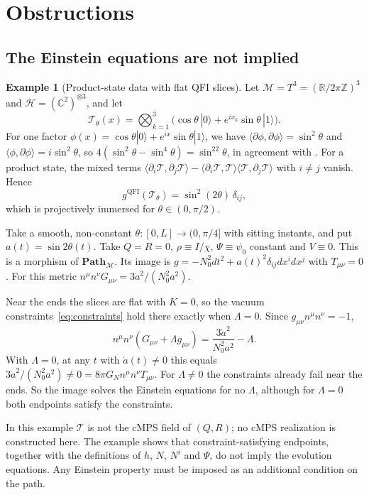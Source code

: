 \documentclass[11pt,a4paper,reqno]{amsart}
\theoremstyle{definition}
\newtheorem{example}[theorem]{Example}
\numberwithin{equation}{section}
\newcommand{\R}{\mathbb{R}}
\newcommand{\C}{\mathbb{C}}
\newcommand{\QFI}{\mathrm{QFI}}
\newcommand{\Path}{\mathbf{Path}_{\mathcal{M}}}
\begin{document}
\section{Obstructions}
\label{sec:obstructions}

\subsection{The Einstein equations are not implied}

\begin{example}[Product-state data with flat QFI slices]\label{ex:frw}
Let $\mathcal{M}=T^3=(\R/2\pi\mathbb{Z})^3$ and $\mathcal{H}=(\C^2)^{\otimes3}$, and let
\[
\mathcal{T}_\theta(x)=\bigotimes_{k=1}^3\big(\cos\theta\,|0\rangle+e^{ix_k}\sin\theta\,|1\rangle\big).
\]
For one factor $\phi(x)=\cos\theta|0\rangle+e^{ix}\sin\theta|1\rangle$, we have $\langle\partial\phi,\partial\phi\rangle=\sin^2\theta$ and $\langle\phi,\partial\phi\rangle=i\sin^2\theta$, so $4(\sin^2\theta-\sin^4\theta)=\sin^22\theta$, in agreement with \cite[Eq.~(29)]{liu2020qfi}. For a product state, the mixed terms $\langle\partial_i\mathcal{T},\partial_j\mathcal{T}\rangle-\langle\partial_i\mathcal{T},\mathcal{T}\rangle\langle\mathcal{T},\partial_j\mathcal{T}\rangle$ with $i\neq j$ vanish. Hence
\[
g^{\QFI}(\mathcal{T}_\theta)=\sin^2(2\theta)\,\delta_{ij},
\]
which is projectively immersed for $\theta\in(0,\pi/2)$.

Take a smooth, non-constant $\theta:[0,L]\to(0,\pi/4]$ with sitting instants, and put $a(t)=\sin2\theta(t)$. Take $Q=R=0$, $\rho\equiv I/\chi$, $\Psi\equiv\psi_0$ constant and $V\equiv0$. This is a morphism of $\Path$. Its image is $g=-N_0^2dt^2+a(t)^2\delta_{ij}dx^idx^j$ with $T_{\mu\nu}=0$. For this metric $n^\mu n^\nu G_{\mu\nu}=3\dot a^2/(N_0^2a^2)$.

Near the ends the slices are flat with $K=0$, so the vacuum constraints~\eqref{eq:constraints} hold there exactly when $\Lambda=0$. Since $g_{\mu\nu}n^\mu n^\nu=-1$,
\[
n^\mu n^\nu(G_{\mu\nu}+\Lambda g_{\mu\nu})=\frac{3\dot a^2}{N_0^2a^2}-\Lambda .
\]
With $\Lambda=0$, at any $t$ with $\dot a(t)\neq0$ this equals $3\dot a^2/(N_0^2a^2)\neq0=8\pi G_N n^\mu n^\nu T_{\mu\nu}$. For $\Lambda\neq0$ the constraints already fail near the ends. So the image solves the Einstein equations for no $\Lambda$, although for $\Lambda=0$ both endpoints satisfy the constraints.

In this example $\mathcal{T}$ is not the cMPS field of $(Q,R)$; no cMPS realization is constructed here. The example shows that constraint-satisfying endpoints, together with the definitions of $h$, $N$, $N^i$ and $\Psi$, do not imply the evolution equations. Any Einstein property must be imposed as an additional condition on the path.
\end{example}
\end{document}
